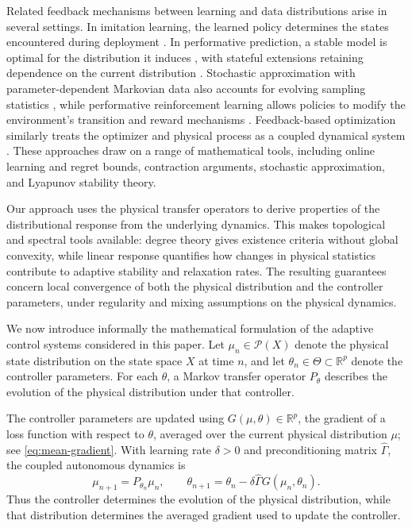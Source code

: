 \documentclass[11pt]{article}
\theoremstyle{definition}
\theoremstyle{remark}
\newcommand{\Prob}{\mathcal{P}}
\newcommand{\R}{\mathbb{R}}
\newcommand{\ThetaSet}{\Theta}
\newcommand{\Gammahat}{\widehat{\Gamma}}
\begin{document}




Related feedback mechanisms between learning and data distributions
arise in several settings. In imitation learning, the learned policy
determines the states encountered during deployment
\cite{RossGordonBagnell2011}. In performative prediction, a stable
model is optimal for the distribution it induces
\cite{PerdomoEtAl2020}, with stateful extensions retaining dependence
on the current distribution \cite{BrownHodKalemaj2022}.
Stochastic approximation with parameter-dependent Markovian data
also accounts for evolving sampling statistics
\cite{KondaTsitsiklis2003,LiWai2022,LiuLiWai2024},
while performative reinforcement learning allows policies to modify
the environment's transition and reward mechanisms
\cite{MandalEtAl2023}.
Feedback-based optimization similarly treats the optimizer and
physical process as a coupled dynamical system
\cite{HauswirthEtAl2024}.
These approaches draw on a range of mathematical tools, including
online learning and regret bounds, contraction arguments,
stochastic approximation, and Lyapunov stability theory.

Our approach uses the physical transfer operators to derive
properties of the distributional response from the underlying
dynamics. This makes topological and spectral tools available:
degree theory gives existence criteria without global convexity,
while linear response quantifies how changes in physical
statistics contribute to adaptive stability and relaxation rates.
The resulting guarantees concern local convergence of both the
physical distribution and the controller parameters, under
regularity and mixing assumptions on the physical dynamics.

We now introduce informally the mathematical formulation of the adaptive
control systems considered in this paper.
Let $\mu_n\in\Prob(X)$ denote the physical state distribution
on the state space $X$ at time $n$, and let
$\theta_n\in\ThetaSet\subset\R^p$ denote the controller parameters.
For each $\theta$, a Markov transfer operator $P_\theta$
describes the evolution of the physical distribution under
that controller.

The controller parameters are updated using
$G(\mu,\theta)\in\R^p$, the gradient of a loss function with
respect to $\theta$, averaged over the current physical
distribution $\mu$; see \eqref{eq:mean-gradient}.
With learning rate $\delta>0$ and preconditioning matrix
$\Gammahat$, the coupled autonomous dynamics is
\begin{equation}
  \mu_{n+1}=P_{\theta_n}\mu_n,
  \qquad
  \theta_{n+1}=\theta_n-\delta\Gammahat G(\mu_n,\theta_n).
  \label{eq:intro-pair-dynamics}
\end{equation}
Thus the controller determines the evolution of the physical
distribution, while that distribution determines the averaged
gradient used to update the controller.
\end{document}
